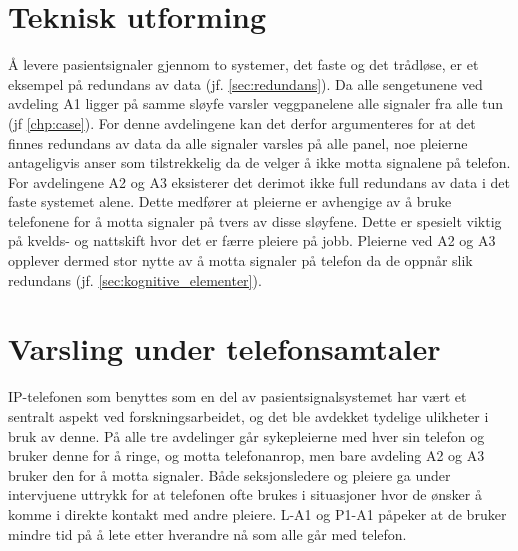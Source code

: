 \section{Teknisk utforming}
Å levere pasientsignaler gjennom to systemer, det faste og det trådløse, er et eksempel på redundans av data (jf. \ref{sec:redundans}). 
Da alle sengetunene ved avdeling A1 ligger på samme sløyfe varsler veggpanelene alle signaler fra alle tun (jf \ref{chp:case}). For denne avdelingene kan det derfor argumenteres for at det finnes redundans av data da alle signaler varsles på alle panel, noe pleierne antageligvis anser som tilstrekkelig da de velger å ikke motta signalene på telefon. For avdelingene A2 og A3 eksisterer det derimot ikke full redundans av data i det faste systemet alene. Dette medfører at pleierne er avhengige av å bruke telefonene for å motta signaler på tvers av disse sløyfene. Dette er spesielt viktig på kvelds- og nattskift hvor det er færre pleiere på jobb. Pleierne ved A2 og A3 opplever dermed stor nytte av å motta signaler på telefon da de oppnår slik redundans (jf. \ref{sec:kognitive_elementer}).

\section{Varsling under telefonsamtaler}
IP-telefonen som benyttes som en del av pasientsignalsystemet har vært et sentralt aspekt ved forskningsarbeidet, og det ble avdekket tydelige ulikheter i bruk av denne. På alle tre avdelinger går sykepleierne med hver sin telefon og bruker denne for å ringe, og motta telefonanrop, men bare avdeling A2 og A3 bruker den for å motta signaler. Både seksjonsledere og pleiere ga under intervjuene uttrykk for at telefonen ofte brukes i situasjoner hvor de ønsker å komme i direkte kontakt med andre pleiere. L-A1 og P1-A1 påpeker at de bruker mindre tid på å lete etter hverandre nå som alle går med telefon.   

